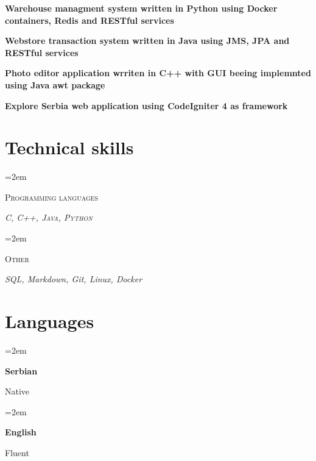 \documentclass[12pt]{article}
\newlength{\spacebox}
\newcommand{\sepspace}{\vspace*{1em}}
\newcommand{\skill}[2]{
  \noindent\hangindent=2em\hangafter=0
  \parbox{3\spacebox}{%
    \textsc{#1}} %
  \textsl{#2} \par} %
\newcommand{\lan}[2]{
    \noindent\hangindent=2em\hangafter=0
    \parbox{\spacebox}{%
        \textbf{#1}} %
     #2 \par}    %
\newcommand{\project}[1]{

  \noindent  \textbf{#1}
  
\normalsize \par}
\begin{document}
\project{Warehouse managment system written in Python using Docker containers, Redis and RESTful services}

\project{Webstore transaction system written in Java using JMS, JPA and RESTful services}

\project{Photo editor application wrriten in C++ with GUI beeing implemnted using Java awt package}

\project{Explore Serbia web application using CodeIgniter 4 as framework}


\sepspace

\section*{Technical skills}

\skill{Programming languages}{
  \textsc{C}, \textsc{C++}, \textsc{Java}, \textsc{Python}}
\skill{Other}{
  \textsl{SQL, Markdown, Git, Linux, Docker}}

\section*{Languages}
\lan{Serbian}{Native}
\lan{English}{Fluent}
\end{document}
